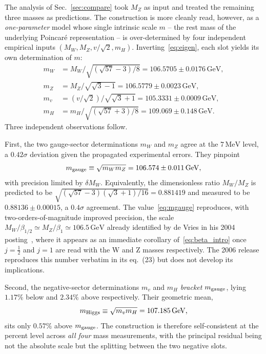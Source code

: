 \documentclass[twocolumn,aps,prd,floatfix,nofootinbib,superscriptaddress,10pt]{article}
\newcommand{\MW}{M_W}
\newcommand{\MZ}{M_Z}
\newcommand{\mH}{m_H}
\newcommand{\GeV}{\,\mathrm{GeV}}
\newcommand{\MeV}{\,\mathrm{MeV}}
\begin{document}
The analysis of Sec.~\ref{sec:compare} took $\MZ$ as input and treated the remaining three masses as predictions. The construction is more cleanly read, however, as a {\em one-parameter} model whose single intrinsic scale $m$ -- the rest mass of the underlying Poincar\'e representation -- is over-determined by four independent empirical inputs $(\MW,\MZ,v/\sqrt{2},\mH)$. Inverting~\eqref{eq:eigen}, each slot yields its own determination of $m$:
\begin{align}
m_W &= \MW/\sqrt{(\sqrt{57}-3)/8} = 106.5705\pm 0.0176\GeV,\\
m_Z &= \MZ/\sqrt{\sqrt{3}-1} = 106.5779\pm 0.0023\GeV,\\
m_{v} &= (v/\sqrt{2})/\sqrt{\sqrt{3}+1} = 105.3331\pm 0.0009\GeV,\\
m_{H} &= \mH/\sqrt{(\sqrt{57}+3)/8} = 109.069\pm 0.148\GeV.
\end{align}
Three independent observations follow.

First, the two gauge-sector determinations $m_W$ and $m_Z$ agree at the $7\MeV$ level, a $0.42\sigma$ deviation given the propagated experimental errors. They pinpoint
\begin{equation}
m_{\rm gauge} \equiv \sqrt{m_W m_Z} = 106.574\pm 0.011\GeV,
\label{eq:mgauge}
\end{equation}
with precision limited by $\delta\MW$. Equivalently, the dimensionless ratio $\MW/\MZ$ is predicted to be $\sqrt{(\sqrt{57}-3)(\sqrt{3}+1)/16}=0.881419$ and measured to be $0.88136\pm 0.00015$, a $0.4\sigma$ agreement. The value~\eqref{eq:mgauge} reproduces, with two-orders-of-magnitude improved precision, the scale $\MW/\beta_{1/2}\simeq\MZ/\beta_1\simeq 106.5\GeV$ already identified by de Vries in his 2004 posting~\cite{deVries2004}, where it appears as an immediate corollary of~\eqref{eq:beta_intro} once $j=\tfrac12$ and $j=1$ are read with the W and Z masses respectively. The 2006 release~\cite{Rivero2006} reproduces this number verbatim in its eq.~(23) but does not develop its implications.

Second, the negative-sector determinations $m_v$ and $m_H$ {\em bracket} $m_{\rm gauge}$, lying $1.17\%$ below and $2.34\%$ above respectively. Their geometric mean,
\begin{equation}
m_{\rm Higgs} \equiv \sqrt{m_v m_H} = 107.185\GeV,
\label{eq:mhiggs}
\end{equation}
sits only $0.57\%$ above $m_{\rm gauge}$. The construction is therefore self-consistent at the percent level across {\em all four} mass measurements, with the principal residual being not the absolute scale but the splitting between the two negative slots.
\end{document}
